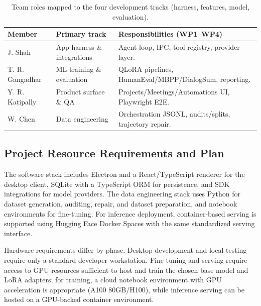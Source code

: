 \documentclass[conference]{IEEEtran}
\begin{document}
\begin{table}[!t]
\caption{Team roles mapped to the four development tracks (harness, features, model, evaluation).}
\label{tab:team_roles}
\centering
\footnotesize
\setlength{\tabcolsep}{3pt}
\renewcommand{\arraystretch}{1.12}
\begin{tabularx}{\columnwidth}{@{}l >{\raggedright\arraybackslash}p{} >{\raggedright\arraybackslash}X @{}}
\toprule
\textbf{Member} & \textbf{Primary track} & \textbf{Responsibilities (WP1--WP4)} \\
\midrule
J. Shah & App harness \& integrations & Agent loop, IPC, tool registry, provider layer. \\
T. R. Gangadhar & ML training \& evaluation & QLoRA pipelines, HumanEval/MBPP/DialogSum, reporting. \\
Y. R. Katipally & Product surface \& QA & Projects/Meetings/Automations UI, Playwright E2E. \\
W. Chen & Data engineering & Orchestration JSONL, audits/splits, trajectory repair. \\
\bottomrule
\end{tabularx}
\end{table}

\subsection{Project Resource Requirements and Plan}
The software stack includes Electron and a React/TypeScript renderer for the desktop client, SQLite with a TypeScript ORM for persistence, and SDK integrations for model providers. The data engineering stack uses Python for dataset generation, auditing, repair, and dataset preparation, and notebook environments for fine-tuning. For inference deployment, container-based serving is supported using Hugging Face Docker Spaces with the same standardized serving interface.

Hardware requirements differ by phase. Desktop development and local testing require only a standard developer workstation. Fine-tuning and serving require access to GPU resources sufficient to host and train the chosen base model and LoRA adapters; for training, a cloud notebook environment with GPU acceleration is appropriate (A100 80GB/H100), while inference serving can be hosted on a GPU-backed container environment.
\end{document}

